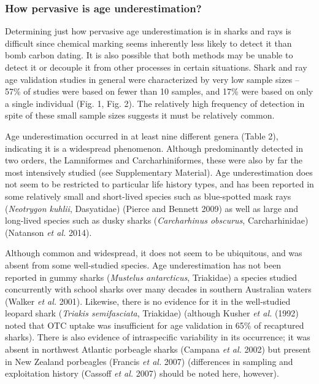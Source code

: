 \documentclass[]{article}
\begin{document}
\subsubsection{How pervasive is age
underestimation?}\label{how-pervasive-is-age-underestimation}

Determining just how pervasive age underestimation is in sharks and rays
is difficult since chemical marking seems inherently less likely to
detect it than bomb carbon dating. It is also possible that both methods
may be unable to detect it or decouple it from other processes in
certain situations. Shark and ray age validation studies in general were
characterized by very low sample sizes -- 57\% of studies were based on
fewer than 10 samples, and 17\% were based on only a single individual
(Fig. 1, Fig. 2). The relatively high frequency of detection in spite of
these small sample sizes suggests it must be relatively common.

Age underestimation occurred in at least nine different genera (Table
2), indicating it is a widespread phenomenon. Although predominantly
detected in two orders, the Lamniformes and Carcharhiniformes, these
were also by far the most intensively studied (see Supplementary
Material). Age underestimation does not seem to be restricted to
particular life history types, and has been reported in some relatively
small and short-lived species such as blue-spotted mask rays
(\emph{Neotrygon kuhlii}, Dasyatidae) (Pierce and Bennett 2009) as well
as large and long-lived species such as dusky sharks (\emph{Carcharhinus
obscurus}, Carcharhinidae) (Natanson \emph{et al.} 2014).

Although common and widespread, it does not seem to be ubiquitous, and
was absent from some well-studied species. Age underestimation has not
been reported in gummy sharks (\emph{Mustelus antarcticus}, Triakidae) a
species studied concurrently with school sharks over many decades in
southern Australian waters (Walker \emph{et al.} 2001). Likewise, there
is no evidence for it in the well-studied leopard shark (\emph{Triakis
semifasciata}, Triakidae) (although Kusher \emph{et al.} (1992) noted
that OTC uptake was insufficient for age validation in 65\% of
recaptured sharks). There is also evidence of intraspecific variability
in its occurrence; it was absent in northwest Atlantic porbeagle sharks
(Campana \emph{et al.} 2002) but present in New Zealand porbeagles
(Francis \emph{et al.} 2007) (differences in sampling and exploitation
history (Cassoff \emph{et al.} 2007) should be noted here, however).
\end{document}
